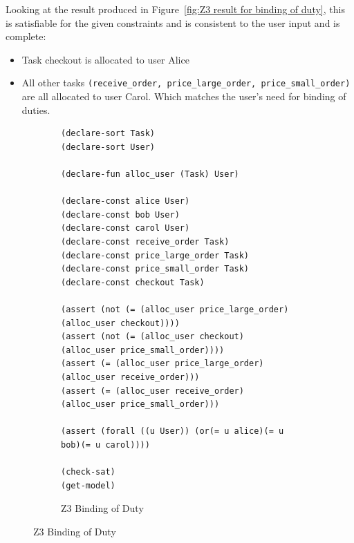 \documentclass[a4paper]{report}
\begin{document}
Looking at the result produced in Figure~\ref{fig:Z3 result for binding of duty}, this is satisfiable for the given constraints and is consistent to the user input and is complete:
\begin{itemize}
\item Task checkout is allocated to user Alice
\item All other tasks \texttt{(receive\_order, price\_large\_order, price\_small\_order)} are all allocated to user Carol. Which matches the user’s need for binding of duties.
\end{itemize}
\begin{figure}[!h]
\begin{subfigure}{\textwidth}
\lstset{numbers=left, showspaces=false,
    showstringspaces=false, tabsize=2, breaklines=true,
    xleftmargin=5.0ex,
}
\begin{lstlisting}[frame=single]
(declare-sort Task)
(declare-sort User)

(declare-fun alloc_user (Task) User)

(declare-const alice User)
(declare-const bob User)
(declare-const carol User)
(declare-const receive_order Task)
(declare-const price_large_order Task)
(declare-const price_small_order Task)
(declare-const checkout Task)

(assert (not (= (alloc_user price_large_order) (alloc_user checkout))))
(assert (not (= (alloc_user checkout) (alloc_user price_small_order))))
(assert (= (alloc_user price_large_order) (alloc_user receive_order)))
(assert (= (alloc_user receive_order) (alloc_user price_small_order)))

(assert (forall ((u User)) (or(= u alice)(= u bob)(= u carol))))

(check-sat)
(get-model)
\end{lstlisting}
\caption{Z3 Binding of Duty}
\label{fig:Z3 Binding of Duty}
\end{subfigure}
\end{figure}
\clearpage
\end{document}
